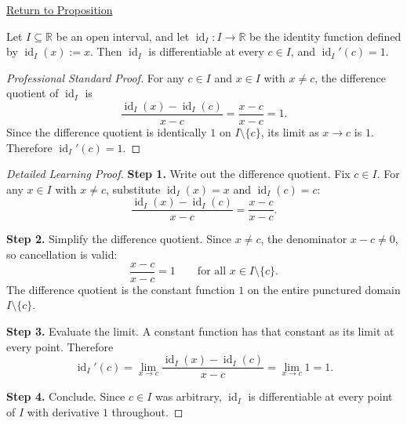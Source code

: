 \newpage
{}
\label{prf:derivative-of-the-identity}

\begin{remark*}[Return]
\hyperref[prop:derivative-of-the-identity]{Return to Proposition}
\end{remark*}

\begin{proposition*}
Let $I \subseteq \mathbb{R}$ be an open interval, and let $\operatorname{id}_I : I \to \mathbb{R}$ be the identity function defined by $\operatorname{id}_I(x) := x$. Then $\operatorname{id}_I$ is differentiable at every $c \in I$, and $\operatorname{id}_I'(c) = 1$.
\end{proposition*}

\begin{proof}[Professional Standard Proof]
\LRAProofBodyStart
For any $c \in I$ and $x \in I$ with $x \neq c$, the difference quotient of $\operatorname{id}_I$ is
\[
\frac{\operatorname{id}_I(x) - \operatorname{id}_I(c)}{x - c} = \frac{x - c}{x - c} = 1.
\]
Since the difference quotient is identically $1$ on $I \setminus \{c\}$, its limit as $x \to c$ is $1$. Therefore $\operatorname{id}_I'(c) = 1$.
\end{proof}

\begin{proof}[Detailed Learning Proof]
\LRAProofBodyStart

\textbf{Step 1.} Write out the difference quotient. Fix $c \in I$. For any $x \in I$ with $x \neq c$, substitute $\operatorname{id}_I(x) = x$ and $\operatorname{id}_I(c) = c$:
\[
\frac{\operatorname{id}_I(x) - \operatorname{id}_I(c)}{x - c} = \frac{x - c}{x - c}.
\]

\textbf{Step 2.} Simplify the difference quotient. Since $x \neq c$, the denominator $x - c \neq 0$, so cancellation is valid:
\[
\frac{x - c}{x - c} = 1 \qquad \text{for all } x \in I \setminus \{c\}.
\]
The difference quotient is the constant function $1$ on the entire punctured domain $I \setminus \{c\}$.

\textbf{Step 3.} Evaluate the limit. A constant function has that constant as its limit at every point. Therefore
\[
\operatorname{id}_I'(c) = \lim_{x \to c} \frac{\operatorname{id}_I(x) - \operatorname{id}_I(c)}{x - c} = \lim_{x \to c} 1 = 1.
\]

\textbf{Step 4.} Conclude. Since $c \in I$ was arbitrary, $\operatorname{id}_I$ is differentiable at every point of $I$ with derivative $1$ throughout.
\end{proof}

